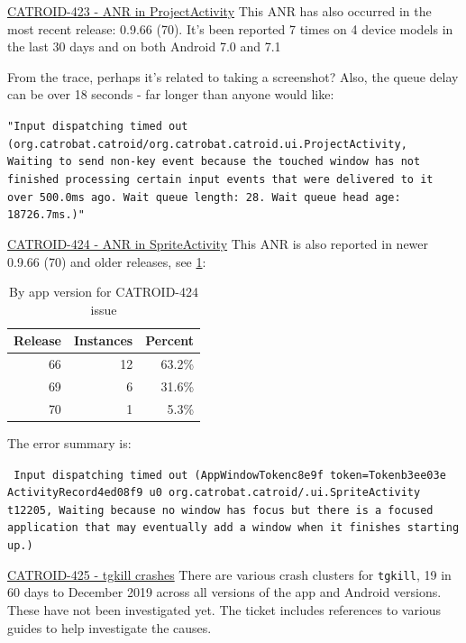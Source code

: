 \href{https://jira.catrob.at/browse/CATROID-423}{CATROID-423 - ANR in ProjectActivity} This ANR has also occurred in the most recent release: 0.9.66 (70). It's been reported 7 times on 4 device models in the last 30 days and on both Android 7.0 and 7.1

From the trace, perhaps it's related to taking a screenshot? Also, the queue delay can be over 18 seconds - far longer than anyone would like:

\texttt{\footnotesize{"Input dispatching timed out \\(org.catrobat.catroid/org.catrobat.catroid.ui.ProjectActivity, \\Waiting to send non-key event because the touched window has not finished processing certain input events that were delivered to it over 500.0ms ago. Wait queue length: 28. Wait queue head age: 18726.7ms.)"}}

\href{https://jira.catrob.at/browse/CATROID-424}{CATROID-424 - ANR in SpriteActivity} This ANR is also reported in newer 0.9.66 (70) and older releases, see \ref{tab:catroid_424}:

\begin{table}[htbp!]
    \centering
    \begin{tabular}{r|r|r}
Release	&Instances	&Percent \\
\hline
66	&12	&63.2\% \\
69	&6	&31.6\% \\
70	&1	&5.3\% \\
    \end{tabular}
    \caption{By app version for CATROID-424 issue}
    \label{tab:catroid_424}
\end{table}

The error summary is:

\texttt{\footnotesize{
Input dispatching timed out (AppWindowToken{c8e9f token=Token{b3ee03e ActivityRecord{4ed08f9 u0 org.catrobat.catroid/.ui.SpriteActivity t12205}}}, Waiting because no window has focus but there is a focused application that may eventually add a window when it finishes starting up.)}}

\href{https://jira.catrob.at/browse/CATROID-425}{CATROID-425 - tgkill crashes} There are various crash clusters for \texttt{tgkill}, 19 in 60 days to  December 2019 across all versions of the app and Android versions. These have not been investigated yet. The ticket includes references to various guides to help investigate the causes.

